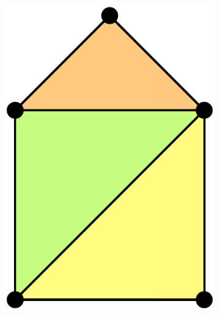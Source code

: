 \begin{figure}
\centering
\begin{subfigure}[b]{0.27\linewidth}
\includegraphics[width=\linewidth]{figs/halfedge-1}
\caption{}%
\label{subfig:halfedge-1}
\end{subfigure}
\quad
\begin{subfigure}[b]{0.27\linewidth}

\end{subfigure}
\end{figure}

